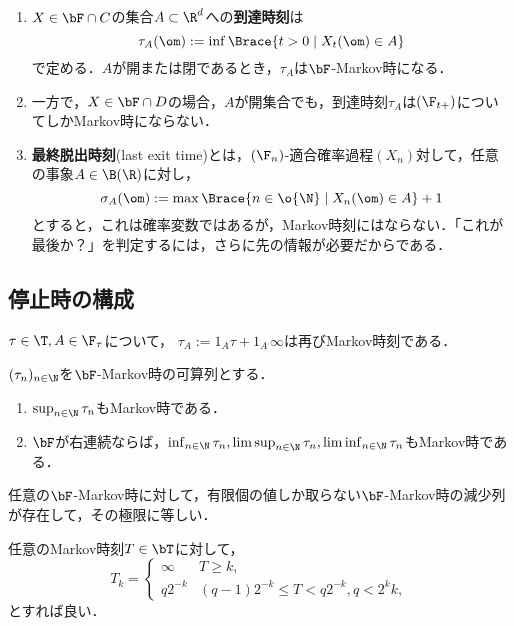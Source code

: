 \documentclass[uplatex,dvipdfmx]{jsreport}
\begin{document}
\begin{example}[停止時の例]\label{exp-discrete-Markov-time}\mbox{}
    \begin{enumerate}
        \item $X\in\bF\cap C$の集合$A\subset\R^d$への\textbf{到達時刻}は
        \[\tau_A(\om):=\inf\Brace{t>0\mid X_t(\om)\in A}\]
        で定める．$A$が開または閉であるとき，$\tau_A$は$\bF$-Markov時になる．
        \item 一方で，$X\in\bF\cap D$の場合，$A$が開集合でも，到達時刻$\tau_A$は$(\F_{t+})$についてしかMarkov時にならない．
        \item \textbf{最終脱出時刻}(last exit time)とは，$(\F_n)$-適合確率過程$(X_n)$対して，任意の事象$A\in\B(\R)$に対し，
        \[\sigma_A(\om):=\max\Brace{n\in\o{\N}\mid X_n(\om)\in A}+1\]
        とすると，これは確率変数ではあるが，Markov時刻にはならない．「これが最後か？」を判定するには，さらに先の情報が必要だからである．
    \end{enumerate}
\end{example}

\subsection{停止時の構成}

\begin{lemma}[Markov時刻の任意停止]
    $\tau\in\T,A\in\F_\tau$について，
    $\tau_A:=1_{A}\tau+1_{A^\comp}\infty$は再びMarkov時刻である．
\end{lemma}

\begin{proposition}[停止時の構成]
    $(\tau_n)_{n\in\N}$を$\bF$-Markov時の可算列とする．
    \begin{enumerate}
        \item $\sup_{n\in\N}\tau_n$もMarkov時である．
        \item $\bF$が右連続ならば，$\inf_{n\in\N}\tau_n,\limsup_{n\in\N}\tau_n,\liminf_{n\in\N}\tau_n$もMarkov時である．
    \end{enumerate}
\end{proposition}

\begin{theorem}[停止時の離散近似]
    任意の$\bF$-Markov時に対して，有限個の値しか取らない$\bF$-Markov時の減少列が存在して，その極限に等しい．
\end{theorem}
\begin{Proof}
    任意のMarkov時刻$T\in\bT$に対して，
    \[T_k=\begin{cases}
        \infty&T\ge k,\\
        q2^{-k}&(q-1)2^{-k}\le T<q2^{-k},q<2^kk,
    \end{cases}\]
    とすれば良い．
\end{Proof}
\end{document}
